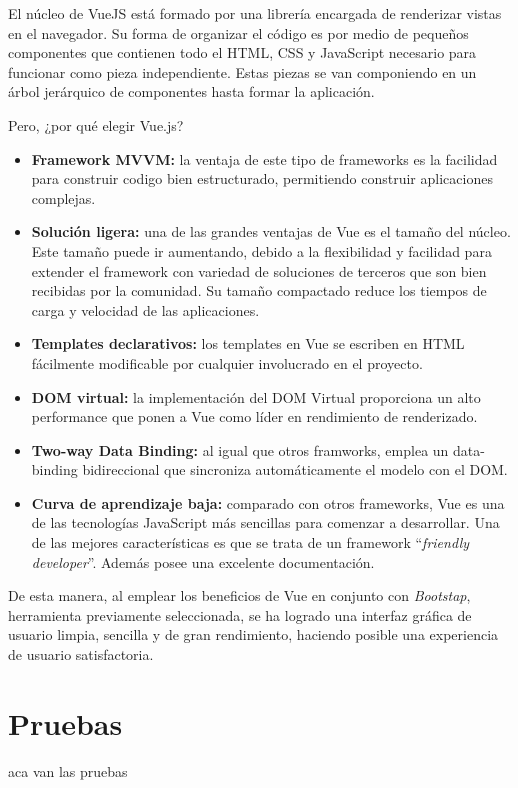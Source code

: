 \documentclass[11pt,oneside]{book}
\begin{document}
El núcleo de VueJS está formado por una librería encargada de renderizar vistas en el navegador. Su forma de organizar el código es por medio de pequeños componentes que contienen todo el HTML, CSS y JavaScript necesario para funcionar como pieza independiente. Estas piezas se van componiendo en un árbol jerárquico de componentes hasta formar la aplicación.

Pero, ¿por qué elegir Vue.js?
\begin{itemize}
\item \textbf{Framework MVVM:} la ventaja de este tipo de frameworks es la facilidad para construir codigo bien estructurado, permitiendo construir aplicaciones complejas.
\item \textbf{Solución ligera:} una de las grandes ventajas de Vue es el tamaño del núcleo. Este tamaño puede ir aumentando, debido a la flexibilidad y facilidad para extender el framework con variedad de soluciones de terceros que son bien recibidas por la comunidad. Su tamaño compactado reduce los tiempos de carga y velocidad de las aplicaciones.
\item \textbf{Templates declarativos:} los templates en Vue se escriben en HTML fácilmente modificable por cualquier involucrado en el proyecto.
\item \textbf{DOM virtual:} la implementación del DOM Virtual proporciona un alto performance que ponen a Vue como líder en rendimiento de renderizado.
\item \textbf{Two-way Data Binding:} al igual que otros framworks, emplea un data-binding bidireccional que sincroniza automáticamente el modelo con el DOM.
\newpage
\item \textbf{Curva de aprendizaje baja:} comparado con otros frameworks, Vue es una de las tecnologías JavaScript más sencillas para comenzar a desarrollar. Una de las mejores características es que se trata de un framework ``\textit{friendly developer}''. Además posee una excelente documentación.
\end{itemize}

De esta manera, al emplear los beneficios de Vue en conjunto con \textit{Bootstap}, herramienta previamente seleccionada, se ha logrado una interfaz gráfica de usuario limpia, sencilla y de gran rendimiento, haciendo posible una experiencia de usuario satisfactoria.

\chapter{Pruebas}
aca van las pruebas
\end{document}
